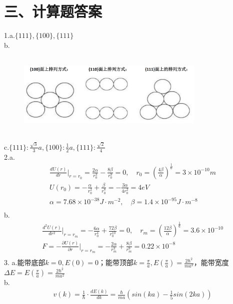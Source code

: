 \documentclass[UTF8]{ctexart}
\begin{document}
\section*{\bfseries 三、计算题答案}
1.a.$\{111\},\{100\},\{111\}$\\
b.
\begin{figure}[H]
    \centering
    \includegraphics[width=9cm,height=4cm]{3_1_b.png}
\end{figure}
c.$\{111\}:\frac{\sqrt3}{3}a,\{100\}:\frac{1}{2}a,\{111\}:\frac{\sqrt2}{4}$\\
2.a.
\begin{equation*}
    \begin{aligned}
        & \frac{dU(r)}{dr}\Bigg\lvert_{r=r_0}=\frac{2\alpha}{r_0^3}-\frac{8\beta}{r_0^9}=0,\quad 
        r_0=(\frac{4\beta}{\alpha})^\frac{1}{6}=3\times10^{-10}m\\
        & U(r_0)=-\frac{\alpha}{r_0^2}+\frac{\beta}{r_0^8}=-\frac{3\alpha}{4r_0^2}=4eV\\
        & \alpha=7.68\times10^{-38}J\cdot m^{-2},\quad\beta=1.4\times10^{-95}J\cdot m^{-8}\\
    \end{aligned}
\end{equation*}
b.
\begin{equation*}
    \begin{aligned}
        &\frac{d^2U(r)}{dr^2}\Bigg\lvert_{r=r_m}=-\frac{6\alpha}{r_0^4}+\frac{72\beta}{r_0^10}=0,\quad
        r_m=(\frac{12\beta}{\alpha})^\frac{1}{6}=3.6\times10^{-10}\\
        &F=-\frac{\partial U(r)}{\partial r}\Bigg\lvert_{r=r_m}=-\frac{2\alpha}{r_m^3}+\frac{8\beta}{r_m^9}
        =0.22\times10^{-8}\\
    \end{aligned}
\end{equation*}
3.
a.能带底部$k=0,E(0)=0$；能带顶部$k=\frac{\pi}{a},E(\frac{\pi}{a})=\frac{2\hbar^2}{ma^2}$，能带宽度$\Delta E=
E(\frac{\pi}{a})=\frac{2\hbar^2}{ma^2}$\\
b.
\begin{equation*}
    \begin{aligned}
        & v(k)=\frac{1}{\hbar}\cdot\frac{dE(k)}{dk}=\frac{\hbar}{ma}(sin(ka)-\frac{1}{5}sin(2ka))\\
    \end{aligned}
\end{equation*}
\end{document}
